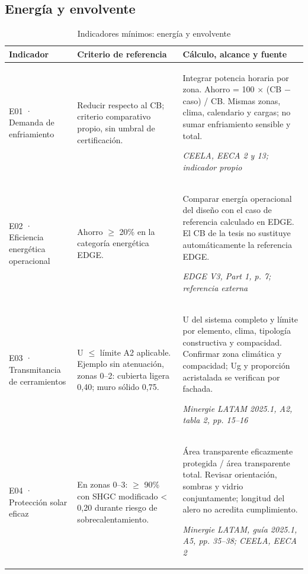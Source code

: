 \subsection{Energía y envolvente}
\begin{table}[H]\centering\caption{Indicadores mínimos: energía y envolvente}
{\fontsize{9.5}{12}\selectfont\singlespacing\renewcommand{\arraystretch}{1.25}\setlength{\tabcolsep}{4pt}\begin{tabular}{>{\raggedright\arraybackslash}p{2.9cm}>{\raggedright\arraybackslash}p{5.2cm}>{\raggedright\arraybackslash}p{5.9cm}}\toprule Indicador & Criterio de referencia & Cálculo, alcance y fuente \\ \midrule
E01 · Demanda de enfriamiento & Reducir respecto al CB; criterio comparativo propio, sin umbral de certificación. & Integrar potencia horaria por zona. Ahorro = 100 × (CB $-$ caso) / CB. Mismas zonas, clima, calendario y cargas; no sumar enfriamiento sensible y total.\par\textit{CEELA, EECA 2 y 13; indicador propio} \\[4pt]
E02 · Eficiencia energética operacional & Ahorro $\geq$ 20\% en la categoría energética EDGE. & Comparar energía operacional del diseño con el caso de referencia calculado en EDGE. El CB de la tesis no sustituye automáticamente la referencia EDGE.\par\textit{EDGE V3, Part 1, p. 7; referencia externa} \\[4pt]
E03 · Transmitancia de cerramientos & U $\leq$ límite A2 aplicable. Ejemplo sin atenuación, zonas 0–2: cubierta ligera 0,40; muro sólido 0,75. & U del sistema completo y límite por elemento, clima, tipología constructiva y compacidad. Confirmar zona climática y compacidad; Ug y proporción acristalada se verifican por fachada.\par\textit{Minergie LATAM 2025.1, A2, tabla 2, pp. 15–16} \\[4pt]
E04 · Protección solar eficaz & En zonas 0–3: $\geq$ 90\% con SHGC modificado < 0,20 durante riesgo de sobrecalentamiento. & Área transparente eficazmente protegida / área transparente total. Revisar orientación, sombras y vidrio conjuntamente; longitud del alero no acredita cumplimiento.\par\textit{Minergie LATAM, guía 2025.1, A5, pp. 35–38; CEELA, EECA 2} \\[4pt]
\bottomrule\end{tabular}}\end{table}\par\medskip
